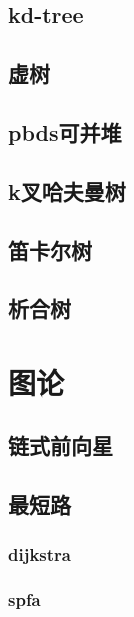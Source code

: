 ﻿\documentclass[a4paper,twocolumn]{article}
\begin{document}
\subsection{kd-tree}

\subsection{虚树}

\subsection{pbds可并堆}

\subsection{k叉哈夫曼树}
\begin{spacing}{1.5}

\end{spacing}

\subsection{笛卡尔树}
\begin{spacing}{1.5}

\end{spacing}

\subsection{析合树}
\begin{spacing}{1.5}

\end{spacing}

\section{图论}
\subsection{链式前向星}

\subsection{最短路}
\subsubsection{dijkstra}

\subsubsection{spfa}

\end{document}

